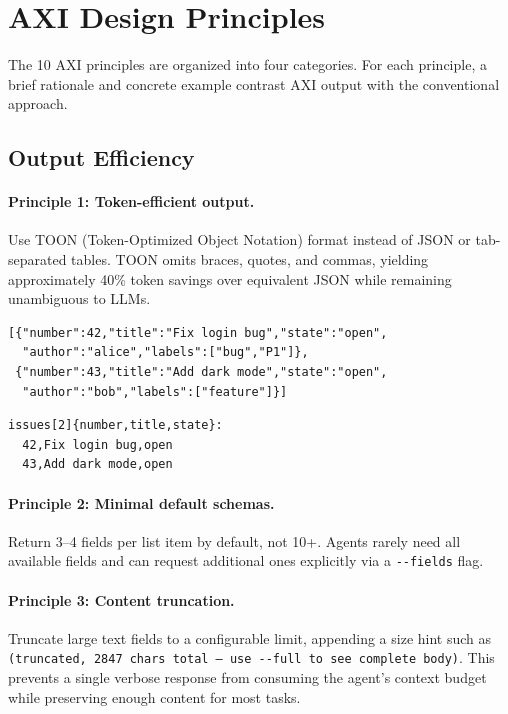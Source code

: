 \documentclass{article}
\begin{document}
\section{AXI Design Principles}
\label{sec:principles}

The 10 AXI principles are organized into four categories. For each principle,
a brief rationale and concrete example contrast AXI output
with the conventional approach.

\subsection{Output Efficiency}

\paragraph{Principle 1: Token-efficient output.}
Use TOON (Token-Optimized Object Notation) format instead of JSON or
tab-separated tables. TOON omits braces, quotes, and commas, yielding
approximately 40\% token savings over equivalent JSON while remaining
unambiguous to LLMs.

\begin{lstlisting}[caption={JSON output for a list of issues (conventional).},label=lst:json]
[{"number":42,"title":"Fix login bug","state":"open",
  "author":"alice","labels":["bug","P1"]},
 {"number":43,"title":"Add dark mode","state":"open",
  "author":"bob","labels":["feature"]}]
\end{lstlisting}

\begin{lstlisting}[caption={TOON output for the same list (AXI).},label=lst:toon]
issues[2]{number,title,state}:
  42,Fix login bug,open
  43,Add dark mode,open
\end{lstlisting}

\paragraph{Principle 2: Minimal default schemas.}
Return 3--4 fields per list item by default, not 10+. Agents rarely need
all available fields and can request additional ones explicitly via
a \texttt{-{}-fields} flag.

\paragraph{Principle 3: Content truncation.}
Truncate large text fields to a configurable limit, appending a size hint
such as \texttt{(truncated, 2847 chars total --- use -{}-full to see
complete body)}. This prevents a single verbose response from consuming
the agent's context budget while preserving enough content for most tasks.
\end{document}

